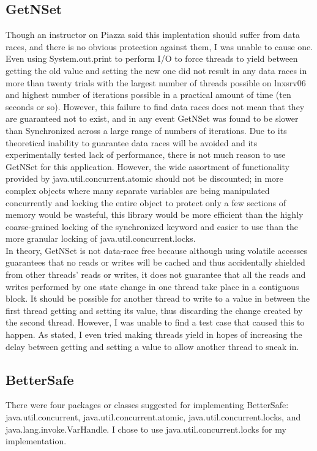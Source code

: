 \documentclass[letterpaper,twocolumn,10pt]{article}
\begin{document}
\subsection{GetNSet}
Though an instructor on Piazza said this implentation should suffer from data races, and there is no obvious protection against them, I was unable to cause one. Even using System.out.print to perform I/O to force threads to yield between getting the old value and setting the new one did not result in any data races in more than twenty trials with the largest number of threads possible on lnxsrv06 and highest number of iterations possible in a practical amount of time (ten seconds or so). However, this failure to find data races does not mean that they are guaranteed not to exist, and in any event GetNSet was found to be slower than Synchronized across a large range of numbers of iterations. Due to its theoretical inability to guarantee data races will be avoided and its experimentally tested lack of performance, there is not much reason to use GetNSet for this application. However, the wide assortment of functionality provided by java.util.concurrent.atomic should not be discounted; in more complex objects where many separate variables are being manipulated concurrently and locking the entire object to protect only a few sections of memory would be wasteful, this library would be more efficient than the highly coarse-grained locking of the synchronized keyword and easier to use than the more granular locking of java.util.concurrent.locks. \\
In theory, GetNSet is not data-race free because although using volatile accesses guarantees that no reads or writes will be cached and thus accidentally shielded from other threads' reads or writes, it does not guarantee that all the reads and writes performed by one state change in one thread take place in a contiguous block. It should be possible for another thread to write to a value in between the first thread getting and setting its value, thus discarding the change created by the second thread. However, I was unable to find a test case that caused this to happen. As stated, I even tried making threads yield in hopes of increasing the delay between getting and setting a value to allow another thread to sneak in.
\subsection{BetterSafe}
There were four packages or classes suggested for implementing BetterSafe: java.util.concurrent, java.util.concurrent.atomic, java.util.concurrent.locks, and java.lang.invoke.VarHandle.
I chose to use java.util.concurrent.locks for my implementation. \\
\end{document}
